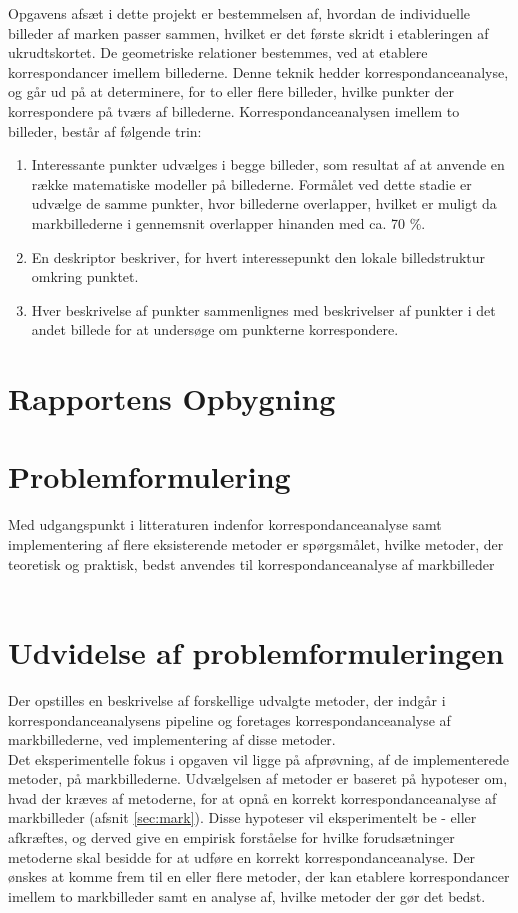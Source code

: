 Opgavens afsæt i dette projekt er bestemmelsen af, hvordan de individuelle billeder af marken passer sammen, hvilket er det første skridt i etableringen af ukrudtskortet. De geometriske relationer bestemmes, ved at etablere korrespondancer imellem billederne. Denne teknik hedder korrespondanceanalyse, og går ud på at determinere, for to eller flere billeder, hvilke punkter der korrespondere på tværs af billederne. Korrespondanceanalysen imellem to billeder, består af følgende trin: 
\begin{enumerate}
\item{Interessante punkter udvælges i begge billeder, som resultat af at anvende en række matematiske modeller på billederne. Formålet ved dette stadie er udvælge de samme punkter, hvor billederne overlapper, hvilket er muligt da markbillederne i gennemsnit overlapper hinanden med ca. 70 \%.}
\item{En deskriptor beskriver, for hvert interessepunkt den lokale billedstruktur omkring punktet.}
\item{Hver beskrivelse af punkter sammenlignes med beskrivelser af punkter i det andet billede  for at undersøge om punkterne korrespondere.}
\end{enumerate}
\section{Rapportens Opbygning}
\section{Problemformulering} \label{subsec:form}
Med udgangspunkt i litteraturen indenfor
korrespondanceanalyse samt implementering af
flere eksisterende metoder er spørgsmålet, hvilke metoder, der teoretisk og praktisk, bedst anvendes til korrespondanceanalyse af markbilleder \\ \\
\section{Udvidelse af problemformuleringen}
Der opstilles en beskrivelse af forskellige udvalgte metoder, der indgår i korrespondanceanalysens pipeline og foretages korrespondanceanalyse af markbillederne, ved implementering af disse metoder. \\
Det eksperimentelle fokus i opgaven vil ligge på afprøvning, af de implementerede metoder, på markbillederne. Udvælgelsen af metoder er baseret på hypoteser om, hvad der kræves af metoderne, for at opnå en korrekt korrespondanceanalyse af markbilleder (afsnit \ref{sec:mark}). Disse hypoteser vil eksperimentelt be - eller afkræftes, og derved give en empirisk forståelse for hvilke forudsætninger metoderne skal besidde for at udføre en korrekt korrespondanceanalyse. Der ønskes at komme frem til en eller flere metoder, der kan etablere korrespondancer imellem to markbilleder samt en analyse af, hvilke metoder der gør det bedst.
